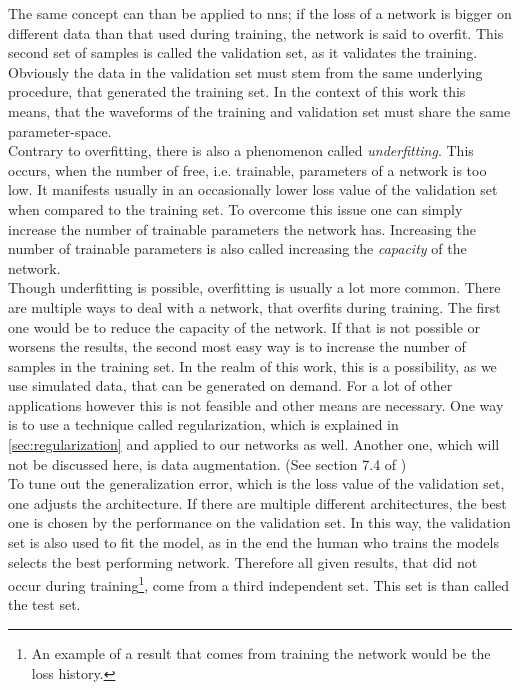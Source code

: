 The same concept can than be applied to \gls{nns}; if the loss of a network is bigger on different data than that used during training, the network is said to overfit. This second set of samples is called the validation set, as it validates the training. Obviously the data in the validation set must stem from the same underlying procedure, that generated the training set. In the context of this work this means, that the waveforms of the training and validation set must share the same parameter-space.\\
Contrary to overfitting, there is also a phenomenon called \emph{underfitting}. This occurs, when the number of free, i.e. trainable, parameters of a network is too low. It manifests usually in an occasionally lower loss value of the validation set when compared to the training set. To overcome this issue one can simply increase the number of trainable parameters the network has. Increasing the number of trainable parameters is also called increasing the \emph{capacity} of the network.\\
Though underfitting is possible, overfitting is usually a lot more common. There are multiple ways to deal with a network, that overfits during training. The first one would be to reduce the capacity of the network. If that is not possible or worsens the results, the second most easy way is to increase the number of samples in the training set. In the realm of this work, this is a possibility, as we use simulated data, that can be generated on demand. For a lot of other applications however this is not feasible and other means are necessary. One way is to use a technique called regularization, which is explained in \autoref{sec:regularization} and applied to our networks as well. Another one, which will not be discussed here, is data augmentation. (See section 7.4 of \cite{deep_learning_book})\\
To tune out the generalization error, which is the loss value of the validation set, one adjusts the architecture. If there are multiple different architectures, the best one is chosen by the performance on the validation set. In this way, the validation set is also used to fit the model, as in the end the human who trains the models selects the best performing network. Therefore all given results, that did not occur during training\footnote{An example of a result that comes from training the network would be the loss history.}, come from a third independent set. This set is than called the test set.\medskip\\
